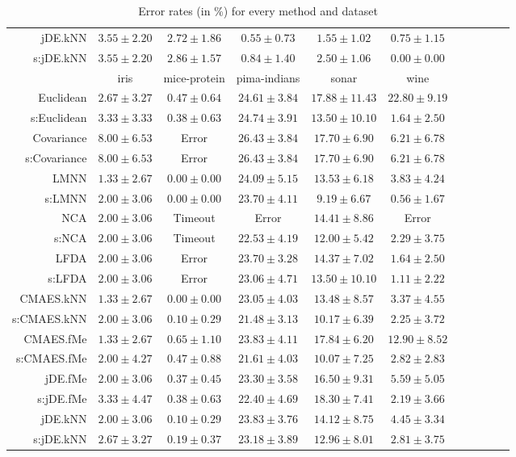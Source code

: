 \begin{table}[ht]
{\begin{tabular}{rcccccccccc}
jDE.kNN & $3.55\pm2.20$ & $2.72\pm1.86$ & $0.55\pm0.73$ & $1.55\pm1.02$ & $0.75\pm1.15$ \\
s:jDE.kNN & $3.55\pm2.20$ & $2.86\pm1.57$ & $0.84\pm1.40$ & $2.50\pm1.06$ & $\bm{0.00\pm0.00}$ \\
\midrule
& \multicolumn{1}{c}{iris} & \multicolumn{1}{c}{mice-protein} & \multicolumn{1}{c}{pima-indians} & \multicolumn{1}{c}{sonar} & \multicolumn{1}{c}{wine} \\ 
\midrule
Euclidean & $2.67\pm3.27$ & $0.47\pm0.64$ & $24.61\pm3.84$ & $17.88\pm11.43$ & $22.80\pm9.19$ \\
s:Euclidean & $3.33\pm3.33$ & $0.38\pm0.63$ & $24.74\pm3.91$ & $13.50\pm10.10$ & $1.64\pm2.50$ \\
Covariance & $8.00\pm6.53$ & Error  & $26.43\pm3.84$ & $17.70\pm6.90$ & $6.21\pm6.78$ \\
s:Covariance & $8.00\pm6.53$ & Error  & $26.43\pm3.84$ & $17.70\pm6.90$ & $6.21\pm6.78$ \\
LMNN & $\bm{1.33\pm2.67}$ & $\bm{0.00\pm0.00}$ & $24.09\pm5.15$ & $13.53\pm6.18$ & $3.83\pm4.24$ \\
s:LMNN & $2.00\pm3.06$ & $\bm{0.00\pm0.00}$ & $23.70\pm4.11$ & $\bm{9.19\pm6.67}$ & $\bm{0.56\pm1.67}$ \\
NCA & $2.00\pm3.06$ & Timeout  & Error  & $14.41\pm8.86$ & Error  \\
s:NCA & $2.00\pm3.06$ & Timeout  & $22.53\pm4.19$ & $12.00\pm5.42$ & $2.29\pm3.75$ \\
LFDA & $2.00\pm3.06$ & Error  & $23.70\pm3.28$ & $14.37\pm7.02$ & $1.64\pm2.50$ \\
s:LFDA & $2.00\pm3.06$ & Error  & $23.06\pm4.71$ & $13.50\pm10.10$ & $1.11\pm2.22$ \\
CMAES.kNN & $\bm{1.33\pm2.67}$ & $\bm{0.00\pm0.00}$ & $23.05\pm4.03$ & $13.48\pm8.57$ & $3.37\pm4.55$ \\
s:CMAES.kNN & $2.00\pm3.06$ & $0.10\pm0.29$ & $\bm{21.48\pm3.13}$ & $10.17\pm6.39$ & $2.25\pm3.72$ \\
CMAES.fMe & $\bm{1.33\pm2.67}$ & $0.65\pm1.10$ & $23.83\pm4.11$ & $17.84\pm6.20$ & $12.90\pm8.52$ \\
s:CMAES.fMe & $2.00\pm4.27$ & $0.47\pm0.88$ & $21.61\pm4.03$ & $10.07\pm7.25$ & $2.82\pm2.83$ \\
jDE.fMe & $2.00\pm3.06$ & $0.37\pm0.45$ & $23.30\pm3.58$ & $16.50\pm9.31$ & $5.59\pm5.05$ \\
s:jDE.fMe & $3.33\pm4.47$ & $0.38\pm0.63$ & $22.40\pm4.69$ & $18.30\pm7.41$ & $2.19\pm3.66$ \\
jDE.kNN & $2.00\pm3.06$ & $0.10\pm0.29$ & $23.83\pm3.76$ & $14.12\pm8.75$ & $4.45\pm3.34$ \\
s:jDE.kNN & $2.67\pm3.27$ & $0.19\pm0.37$ & $23.18\pm3.89$ & $12.96\pm8.01$ & $2.81\pm3.75$ \\


\bottomrule
\end{tabular}
}
\caption{Error rates (in \%) for every method and dataset} \label{tab:error-rates}
\end{table}
